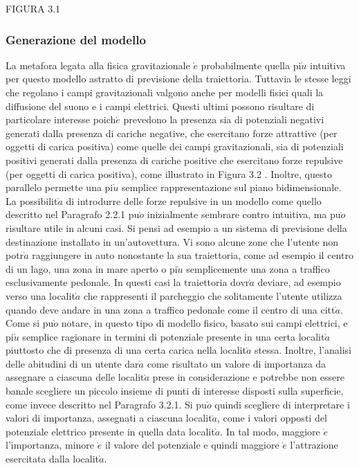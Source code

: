 FIGURA 3.1

\subsubsection{Generazione del modello}
La metafora legata alla fisica gravitazionale $\grave{e}$ probabilmente quella pi$\grave{u}$ intuitiva
per questo modello astratto di previsione della traiettoria. Tuttavia le
stesse leggi che regolano i campi gravitazionali valgono anche per modelli fisici
quali la diffusione del suono e i campi elettrici. Questi ultimi possono risultare
di particolare interesse poich$\acute{e}$ prevedono la presenza sia di potenziali negativi
generati dalla presenza di cariche negative, che esercitano forze attrattive (per
oggetti di carica positiva) come quelle dei campi gravitazionali, sia di potenziali
positivi generati dalla presenza di cariche positive che esercitano forze
repulsive (per oggetti di carica positiva), come illustrato in Figura 3.2 . Inoltre,
questo parallelo permette una pi$\grave{u}$ semplice rappresentazione sul piano
bidimensionale.\\
La possibilit$\grave{a}$ di introdurre delle forze repulsive in un modello come quello
descritto nel Paragrafo 2.2.1 pu$\grave{o}$ inizialmente sembrare contro intuitiva, ma
pu$\grave{o}$ risultare utile in alcuni casi. Si pensi ad esempio a un sistema di previsione
della destinazione installato in un'autovettura. Vi sono alcune zone che l'utente
non potr$\grave{a}$ raggiungere in auto nonostante la sua traiettoria, come ad esempio
il centro di un lago, una zona in mare aperto o pi$\grave{u}$ semplicemente una zona
a traffico esclusivamente pedonale. In questi casi la traiettoria dovr$\grave{a}$ deviare,
ad esempio verso una localit$\grave{a}$ che rappresenti il parcheggio che solitamente
l'utente utilizza quando deve andare in una zona a traffico pedonale come il
centro di una citt$\grave{a}$.\\
Come si pu$\grave{o}$ notare, in questo tipo di modello fisico, basato sui campi
elettrici, e pi$\grave{u}$ semplice ragionare in termini di potenziale presente in una
certa localit$\grave{a}$ piuttosto che di presenza di una certa carica nella localit$\grave{a}$ stessa.
Inoltre, l'analisi delle abitudini di un utente dar$\grave{a}$ come risultato un valore di
importanza da assegnare a ciascuna delle localit$\grave{a}$ prese in considerazione e
potrebbe non essere banale scegliere un piccolo insieme di punti di interesse
disposti sulla superficie, come invece descritto nel Paragrafo 3.2.1. Si pu$\grave{o}$
quindi scegliere di interpretare i valori di importanza, assegnati a ciascuna
localit$\grave{a}$, come i valori opposti del potenziale elettrico presente in quella data
localit$\grave{a}$. In tal modo, maggiore $\grave{e}$ l'importanza, minore $\grave{e}$ il valore del potenziale
e quindi maggiore $\grave{e}$ l'attrazione esercitata dalla localit$\grave{a}$.

